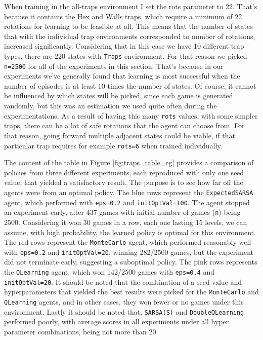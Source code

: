When training in the all-traps environment I set the rots parameter to 22.  That's because it contains the Hex and Walls traps, which require a minimum of 22 rotations for learning to be feasible at all. This means that the number of states that with the individual trap environments corresponded to number of rotations, increased significantly. Considering that in this case we have 10 different trap types, there are 220 states with \texttt{Traps} environment. For that reason we picked \texttt{n=2500} for all of the experiments in this section. That's because in our experiments we've generally found that learning is most successful when the number of episodes is at least 10 times the number of states. Of course, it cannot be influenced by which states will be picked, since each game is generated randomly, but this was an estimation we used quite often during the experimentations. As a result of having this many \texttt{rots} values, with some simpler traps, there can be a lot of safe rotations that the agent can choose from. For that reason, going forward multiple adjacent states could be viable, if that particular trap requires for example \texttt{rots=6} when trained individually.

The content of the table in Figure \ref{fig:traps_table_eg} provides a comparison of policies from three different experiments, each reproduced with only one seed value, that yielded a satisfactory result. The purpose is to see how far off the agents were from an optimal policy. The blue rows represent the \texttt{ExpectedSARSA} agent, which performed with \texttt{eps=0.2} and \texttt{initOptVal=100}. The agent stopped an experiment early, after 437 games with initial number of games (\texttt{n}) being 2500. Considering it won 30 games in a row, each one lasting 15 levels, we can assume, with high probability, the learned policy is optimal for this environment. The red rows represent the \texttt{MonteCarlo} agent, which performed reasonably well with \texttt{eps=0.2} and \texttt{initOptVal=20}, winning 282/2500 games, but the experiment did not terminate early, suggesting a suboptimal policy. The pink rows represents the \texttt{QLearning} agent, which won 142/2500 games with \texttt{eps=0.4} and \texttt{initOptVal=20}. It should be noted that the combination of a seed value and hyperparameters that yielded the best results were picked for the \texttt{MonteCarlo} and \texttt{QLearning} agents, and in other cases, they won fewer or no games under this environment. Lastly it should be noted that, \texttt{SARSA(S)} and \texttt{DoubleQLearning}  performed poorly, with average scores in all experiments under all hyper parameter combinations, being not more than 20.

